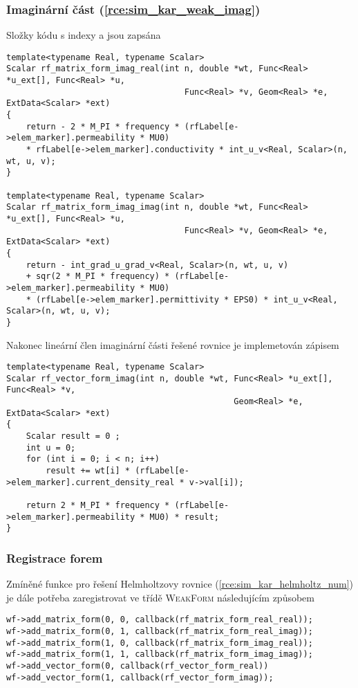 \subsubsection*{Imaginární část (\ref{rce:sim_kar_weak_imag})}
Složky kódu s indexy  a  jsou zapsána
\begin{verbatim}
template<typename Real, typename Scalar>
Scalar rf_matrix_form_imag_real(int n, double *wt, Func<Real> *u_ext[], Func<Real> *u,
									Func<Real> *v, Geom<Real> *e, ExtData<Scalar> *ext)
{
    return - 2 * M_PI * frequency * (rfLabel[e->elem_marker].permeability * MU0) 
    * rfLabel[e->elem_marker].conductivity * int_u_v<Real, Scalar>(n, wt, u, v);
}

template<typename Real, typename Scalar>
Scalar rf_matrix_form_imag_imag(int n, double *wt, Func<Real> *u_ext[], Func<Real> *u,
                                    Func<Real> *v, Geom<Real> *e, ExtData<Scalar> *ext)
{
    return - int_grad_u_grad_v<Real, Scalar>(n, wt, u, v) 
    + sqr(2 * M_PI * frequency) * (rfLabel[e->elem_marker].permeability * MU0) 
    * (rfLabel[e->elem_marker].permittivity * EPS0) * int_u_v<Real, Scalar>(n, wt, u, v);
}
\end{verbatim}
Nakonec lineární člen imaginární části řešené rovnice je implemetován zápisem
\begin{verbatim}
template<typename Real, typename Scalar>
Scalar rf_vector_form_imag(int n, double *wt, Func<Real> *u_ext[], Func<Real> *v,
                                              Geom<Real> *e, ExtData<Scalar> *ext)
{
    Scalar result = 0 ;
    int u = 0;
    for (int i = 0; i < n; i++)
        result += wt[i] * (rfLabel[e->elem_marker].current_density_real * v->val[i]);

    return 2 * M_PI * frequency * (rfLabel[e->elem_marker].permeability * MU0) * result;
}
\end{verbatim}
\subsubsection*{Registrace forem}
Zmíněné funkce pro řešení Helmholtzovy rovnice (\ref{rce:sim_kar_helmholtz_num}) je dále potřeba zaregistrovat ve třídě \textsc{WeakForm} následujícím způsobem
\begin{verbatim}
wf->add_matrix_form(0, 0, callback(rf_matrix_form_real_real));
wf->add_matrix_form(0, 1, callback(rf_matrix_form_real_imag));
wf->add_matrix_form(1, 0, callback(rf_matrix_form_imag_real));
wf->add_matrix_form(1, 1, callback(rf_matrix_form_imag_imag));
wf->add_vector_form(0, callback(rf_vector_form_real))
wf->add_vector_form(1, callback(rf_vector_form_imag));
\end{verbatim}


